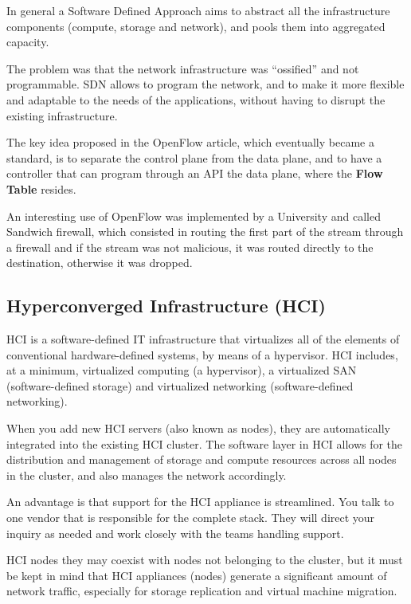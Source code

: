 In general a Software Defined Approach aims to abstract all the infrastructure components (compute, storage and network), and pools them into aggregated capacity.


The problem was that the network infrastructure was ``ossified'' and not programmable. SDN allows to program the network, and to make it more flexible and adaptable to the needs of the applications, without having to disrupt the existing infrastructure.

The key idea proposed in the OpenFlow article, which eventually became a standard, is to separate the control plane from the data plane, and to have a controller that can program through an API the data plane, where the \textbf{Flow Table} resides.

An interesting use of OpenFlow was implemented by a University and called Sandwich firewall, which consisted in routing the first part of the stream through a firewall and if the stream was not malicious, it was routed directly to the destination, otherwise it was dropped.


\subsection{Hyperconverged Infrastructure (HCI)}
\label{sec:HCI_network}
HCI is a software-defined IT infrastructure that virtualizes all of the elements of conventional hardware-defined systems, by means of a hypervisor. HCI includes, at a minimum, virtualized computing (a hypervisor), a virtualized SAN (software-defined storage) and virtualized networking (software-defined networking).

When you add new HCI servers (also known as nodes), they are automatically integrated into the existing HCI cluster. The software layer in HCI allows for the distribution and management of storage and compute resources across all nodes in the cluster, and also manages the network accordingly.

An advantage is that support for the HCI appliance is streamlined. You talk to one vendor that is responsible for the complete stack. They will direct your inquiry as needed and work closely with the teams handling support.

HCI nodes they may coexist with nodes not belonging to the cluster, but it must be kept in mind that HCI appliances (nodes) generate a significant amount of network traffic, especially for storage replication and virtual machine migration.


